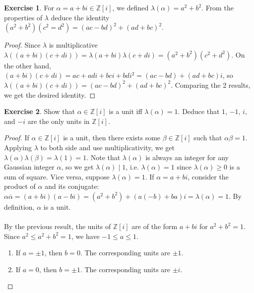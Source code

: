 \documentclass{article}
\theoremstyle{definition}
\newtheorem{exercise}{Exercise}
\begin{document}
\begin{exercise}
For $\alpha = a + bi \in \mathbb{Z}[i]$, we defined $\lambda(\alpha) = a^2 + b^2$. From the properties of $\lambda$ deduce the identity $(a^2 + b^2)(c^2 = d^2) = (ac - bd)^2 + (ad + bc)^2$.
\end{exercise}
\begin{proof}
Since $\lambda$ is multiplicative $\lambda((a + bi) (c + di)) = \lambda(a + bi) \lambda(c + di) = (a^2 + b^2)(c^2 + d^2)$. On the other hand, $(a + bi) (c + di) = ac + ad i +  bc i + bd i^2 = (ac - bd) + (ad + bc)i$, so $\lambda((a + bi) (c + di)) = (ac - bd)^2 + (ad + bc)^2$. Comparing the 2 results, we get the desired identity.
\end{proof}
\begin{exercise}
Show that $\alpha \in \mathbb{Z}[i]$ is a unit iff $\lambda(\alpha) = 1$. Deduce that $1$, $-1$, $i$, and $-i$ are the only units in $\mathbb{Z}[i]$.
\end{exercise}
\begin{proof}
If $\alpha \in \mathbb{Z}[i]$ is a unit, then there exists some $\beta \in \mathbb{Z}[i]$ such that $\alpha \beta = 1$. Applying $\lambda$ to both side and use multiplicativity, we get $\lambda(\alpha) \lambda(\beta) = \lambda(1) = 1$. Note that $\lambda(\alpha)$ is always an integer for any Gaussian integer $\alpha$, so we get $\lambda(\alpha) \mid 1$, i.e. $\lambda(\alpha) = 1$ since $\lambda(\alpha) \geq 0$ is a sum of square. Vice versa, suppose $\lambda(\alpha) = 1$. If $\alpha = a + bi$, consider the product of $\alpha$ and its conjugate: $\alpha \overline{\alpha} = (a + bi)(a - bi) = (a^2 + b^2) + (a(-b) + ba) i = \lambda(\alpha) = 1$. By definition, $\alpha$ is a unit.
\\
\\
By the previous result, the units of $\mathbb{Z}[i]$ are of the form $a + bi$ for $a^2 + b^2 = 1$. Since $a^2 \leq a^2 + b^2 = 1$, we have $-1 \leq a \leq 1$.
\begin{enumerate}
	\item If $a = \pm 1$, then $b = 0$. The corresponding units are $\pm 1$.
	\item If $a = 0$, then $b = \pm 1$. The corresponding units are $\pm i$.
\end{enumerate}
\end{proof}

\newpage
\end{document}
